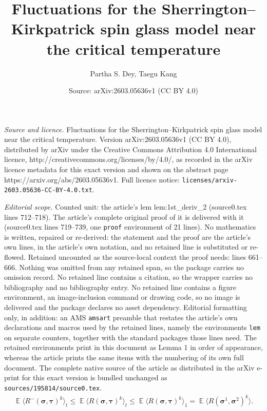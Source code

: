 \documentclass[10pt,a4paper]{amsart}
\title{Fluctuations for the Sherrington--Kirkpatrick spin glass model near the critical temperature}
\author{Partha S. Dey, Taegu Kang}
\date{Source: arXiv:2603.05636v1 (CC BY 4.0)}
\DeclareMathOperator{\E}{\mathds{E}}
\newcommand{\la}{\langle}
\renewcommand{\leq}{\leqslant}
\newcommand{\mvgs}{\boldsymbol{\sigma}}\newcommand{\mvgS}{\boldsymbol{\Sigma}}\newcommand{\mvgt}{\boldsymbol{\tau}}
\newcommand{\ra}{\rangle}
\begin{document}
\maketitle

\noindent\emph{Source and licence.} Fluctuations for the Sherrington--Kirkpatrick spin glass model near the critical temperature. Version arXiv:2603.05636v1 (CC BY 4.0), distributed by arXiv under the Creative Commons Attribution 4.0 International licence, http://creativecommons.org/licenses/by/4.0/, as recorded in the arXiv licence metadata for this exact version and shown on the abstract page https://arxiv.org/abs/2603.05636v1. Full licence notice: \texttt{licenses/arxiv-2603.05636-CC-BY-4.0.txt}.\par\smallskip

\noindent\textit{Editorial scope.} Counted unit: the article's lem lem:1st\_deriv\_2 (source0.tex lines 712--718). The article's complete original proof of it is delivered with it (source0.tex lines 719--739, one \texttt{proof} environment of 21 lines). No mathematics is written, repaired or re-derived: the statement and the proof are the article's own lines, in the article's own notation, and no retained line is substituted or re-flowed.  Retained uncounted as the source-local context the proof needs: lines 661--666.  Nothing was omitted from any retained span, so the package carries no omission record.  No retained line contains a citation, so the wrapper carries no bibliography and no bibliography entry.  No retained line contains a figure environment, an image-inclusion command or drawing code, so no image is delivered and the package declares no asset dependency.  Editorial formatting only, in addition: an AMS \texttt{amsart} preamble that restates the article's own declarations and macros used by the retained lines, namely the environments \texttt{lem} on separate counters, together with the standard packages those lines need.  The retained environments print in this document as Lemma 1 in order of appearance, whereas the article prints the same items with the numbering of its own full document.  The complete native source of the article as distributed in the arXiv e-print for this exact version is bundled unchanged as \texttt{sources/195814/source0.tex}.
    \begin{align}\label{eq:R-(s,t)<R(s,s)}
        \E \la R^-(\mvgs, \mvgt)^k \ra_{t}
        \leq \E \la R(\mvgs, \mvgt)^k \ra_{t}
        \leq \E \la R(\mvgs, \mvgt)^k \ra_{1}
        = \E \la R(\mvgs^1, \mvgs^2)^k \ra.
    \end{align}
\end{document}
